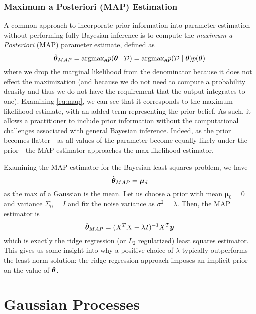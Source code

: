 
\subsubsection{Maximum a Posteriori (MAP) Estimation}

A common approach to incorporate prior information into parameter estimation without performing fully Bayesian inference is to compute the \textit{maximum a Posteriori} (MAP) parameter estimate, defined as 
\begin{equation}
    \hat{\bm{\theta}}_{MAP} = \text{argmax}_{\bm{\theta}}p(\bm{\theta}\mid \mathcal{D})= \text{argmax}_{\bm{\theta}}p(\mathcal{D}\mid \bm{\theta}) p(\bm{\theta}) \label{eq:map}
\end{equation}
where we drop the marginal likelihood from the denominator because it does not effect the maximization (and because we do not need to compute a probability density and thus we do not have the requirement that the output integrates to one). Examining \eqref{eq:map}, we can see that it corresponds to the maximum likelihood estimate, with an added term representing the prior belief. As such, it allows a practitioner to include prior information without the computational challenges associated with general Bayesian inference. Indeed, as the prior becomes flatter---as all values of the parameter become equally likely under the prior---the MAP estimator approaches the max likelihood estimator. 

Examining the MAP estimator for the Bayesian least squares problem, we have 
\begin{equation}
    \hat{\bm{\theta}}_{MAP} = \bm{\mu}_{d}
\end{equation}
as the max of a Gaussian is the mean. Let us choose a prior with mean $\bm{\mu}_0 = 0$ and variance $\Sigma_0 = I$ and fix the noise variance as $\sigma^2 = \lambda$. Then, the MAP estimator is 
\begin{equation}
    \hat{\bm{\theta}}_{MAP} = (X^T X + \lambda I)^{-1} X^T \bm{y}
\end{equation}
which is exactly the ridge regression (or $L_2$ regularized) least squares estimator. This gives us some insight into why a positive choice of $\lambda$ typically outperforms the least norm solution: the ridge regression approach imposes an implicit prior on the value of $\bm{\theta}$.


\section{Gaussian Processes}

